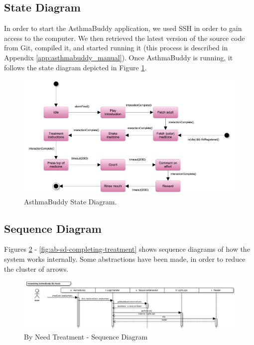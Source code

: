 \subsection{State Diagram}

In order to start the AsthmaBuddy application, we used SSH in order to gain access to the computer. We then retrieved the latest version of the source code from Git, compiled it, and started running it (this process is described in Appendix \ref{app:asthmabuddy_manual}). Once AsthmaBuddy is running, it follows the state diagram depicted in Figure \ref{fig:asthmabuddy_statediagram}.  
  

\begin{figure}[H] 
	\centering
		\includegraphics[width=0.7\paperwidth]{Pictures/statediagram.png}
	\caption{AsthmaBuddy State Diagram.}
	\label{fig:asthmabuddy_statediagram}
\end{figure}

\subsection{Sequence Diagram}
Figures \ref{fig:ab-sd-byneed} - \ref{fig:ab-sd-completing-treatment} shows sequence diagrams of how the system works internally. Some abstractions have been made, in order to reduce the cluster of arrows. 

\begin{figure}
	\centering
		\includegraphics[scale=0.6]{Pictures/sd/sd-byneed.png}
	\caption{By Need Treatment - Sequence Diagram}
	\label{fig:ab-sd-byneed}
\end{figure}

